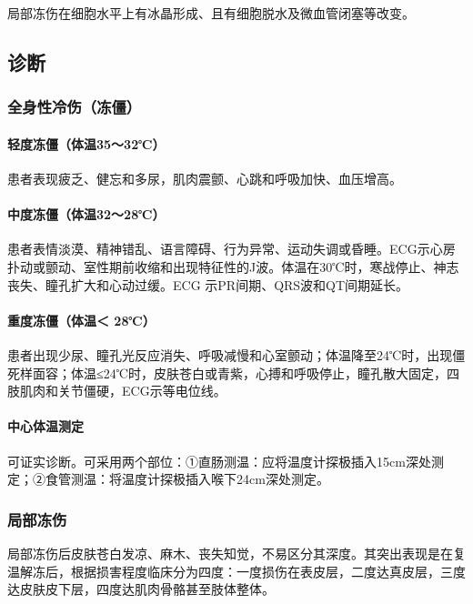 局部冻伤在细胞水平上有冰晶形成、且有细胞脱水及微血管闭塞等改变。

\subsection{诊断}

\subsubsection{全身性冷伤（冻僵）}

\paragraph{轻度冻僵（体温35～32℃）}

患者表现疲乏、健忘和多尿，肌肉震颤、心跳和呼吸加快、血压增高。

\paragraph{中度冻僵（体温32～28℃）}

患者表情淡漠、精神错乱、语言障碍、行为异常、运动失调或昏睡。ECG示心房扑动或颤动、室性期前收缩和出现特征性的J波。体温在30℃时，寒战停止、神志丧失、瞳孔扩大和心动过缓。ECG
示PR间期、QRS波和QT间期延长。

\paragraph{重度冻僵（体温＜ 28℃）}

患者出现少尿、瞳孔光反应消失、呼吸减慢和心室颤动；体温降至24℃时，出现僵死样面容；体温≤24℃时，皮肤苍白或青紫，心搏和呼吸停止，瞳孔散大固定，四肢肌肉和关节僵硬，ECG示等电位线。

\paragraph{中心体温测定}

可证实诊断。可采用两个部位：①直肠测温：应将温度计探极插入15cm深处测定；②食管测温：将温度计探极插入喉下24cm深处测定。

\subsubsection{局部冻伤}

局部冻伤后皮肤苍白发凉、麻木、丧失知觉，不易区分其深度。其突出表现是在复温解冻后，根据损害程度临床分为四度：一度损伤在表皮层，二度达真皮层，三度达皮肤皮下层，四度达肌肉骨骼甚至肢体整体。

